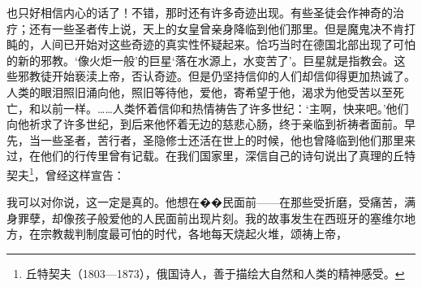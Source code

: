 \par 也只好相信内心的话了！不错，那时还有许多奇迹出现。有些圣徒会作神奇的治疗；还有一些圣者传上说，天上的女皇曾亲身降临到他们那里。但是魔鬼决不肯打盹的，人间已开始对这些奇迹的真实性怀疑起来。恰巧当时在德国北部出现了可怕的新的邪教。‘像火炬一般’的巨星‘落在水源上，水变苦了’。巨星就是指教会。这些邪教徒开始亵渎上帝，否认奇迹。但是仍坚持信仰的人们却信仰得更加热诚了。人类的眼泪照旧涌向他，照旧等待他，爱他，寄希望于他，渴求为他受苦以至死亡，和以前一样。……人类怀着信仰和热情祷告了许多世纪：‘主啊，快来吧。’他们向他祈求了许多世纪，到后来他怀着无边的慈悲心肠，终于亲临到祈祷者面前。早先，当一些圣者，苦行者，圣隐修士还活在世上的时候，他也曾降临到他们那里来过，在他们的行传里曾有记载。在我们国家里，深信自己的诗句说出了真理的丘特契夫\footnote{丘特契夫（1803—1873），俄国诗人，善于描绘大自然和人类的精神感受。}，曾经这样宣告：
\par 我可以对你说，这一定是真的。他想在��民面前——在那些受折磨，受痛苦，满身罪孽，却像孩子般爱他的人民面前出现片刻。我的故事发生在西班牙的塞维尔地方，在宗教裁判制度最可怕的时代，各地每天烧起火堆，颂祷上帝，
